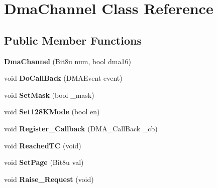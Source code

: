 \hypertarget{classDmaChannel}{\section{Dma\-Channel Class Reference}
\label{classDmaChannel}
}
\subsection*{Public Member Functions}
\begin{DoxyCompactItemize}
\item 
\hypertarget{classDmaChannel_acbbb585f3c95c5c83073644a939b6e36}{{\bfseries Dma\-Channel} (Bit8u num, bool dma16)}\label{classDmaChannel_acbbb585f3c95c5c83073644a939b6e36}

\item 
\hypertarget{classDmaChannel_a21479bb39f01212ebf26954a6c8c261f}{void {\bfseries Do\-Call\-Back} (D\-M\-A\-Event event)}\label{classDmaChannel_a21479bb39f01212ebf26954a6c8c261f}

\item 
\hypertarget{classDmaChannel_a0741a67ee1cce33702c1d372d88d41ed}{void {\bfseries Set\-Mask} (bool \-\_\-mask)}\label{classDmaChannel_a0741a67ee1cce33702c1d372d88d41ed}

\item 
\hypertarget{classDmaChannel_a11b7eaae4166a03aaa88b359ee332127}{void {\bfseries Set128\-K\-Mode} (bool en)}\label{classDmaChannel_a11b7eaae4166a03aaa88b359ee332127}

\item 
\hypertarget{classDmaChannel_a01e21c2bf367fe83ceeebaffb62ddf1d}{void {\bfseries Register\-\_\-\-Callback} (D\-M\-A\-\_\-\-Call\-Back \-\_\-cb)}\label{classDmaChannel_a01e21c2bf367fe83ceeebaffb62ddf1d}

\item 
\hypertarget{classDmaChannel_aaaf6f979441b79aa54654a10c41dbb2f}{void {\bfseries Reached\-T\-C} (void)}\label{classDmaChannel_aaaf6f979441b79aa54654a10c41dbb2f}

\item 
\hypertarget{classDmaChannel_a0241d66f4aa3bb8984f5d67366400f66}{void {\bfseries Set\-Page} (Bit8u val)}\label{classDmaChannel_a0241d66f4aa3bb8984f5d67366400f66}

\item 
\hypertarget{classDmaChannel_ae9d0d61ec1aab2dfaa0c10180ba64ef3}{void {\bfseries Raise\-\_\-\-Request} (void)}\label{classDmaChannel_ae9d0d61ec1aab2dfaa0c10180ba64ef3}


\end{DoxyCompactItemize}

